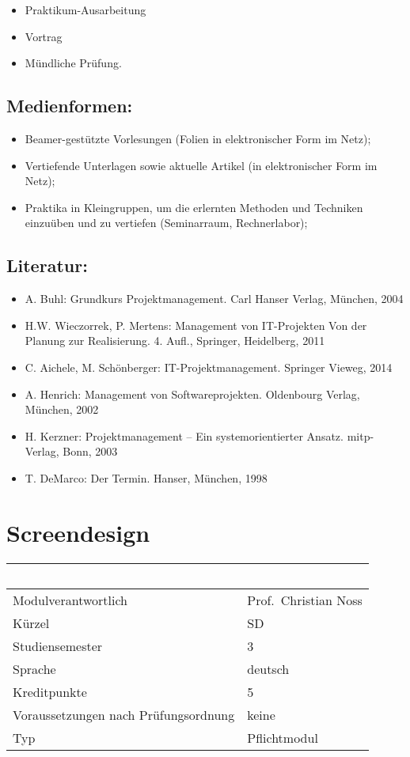 \begin{itemize}
\item
  Praktikum-Ausarbeitung
\item
  Vortrag
\item
  Mündliche Prüfung.
\end{itemize}

\section*{Medienformen:}\label{medienformen-11}

\begin{itemize}
\item
  Beamer-gestützte Vorlesungen (Folien in elektronischer Form im Netz);
\item
  Vertiefende Unterlagen sowie aktuelle Artikel (in elektronischer Form
  im Netz);
\item
  Praktika in Kleingruppen, um die erlernten Methoden und Techniken
  einzuüben und zu vertiefen (Seminarraum, Rechnerlabor);
\end{itemize}

\section*{Literatur:}\label{literatur-16}

\begin{itemize}
\item
  A. Buhl: Grundkurs Projektmanagement. Carl Hanser Verlag, München,
  2004
\item
  H.W. Wieczorrek, P. Mertens: Management von IT-Projekten Von der
  Planung zur Realisierung. 4. Aufl., Springer, Heidelberg, 2011
\item
  C. Aichele, M. Schönberger: IT-Projektmanagement. Springer Vieweg,
  2014
\item
  A. Henrich: Management von Softwareprojekten. Oldenbourg Verlag,
  München, 2002
\item
  H. Kerzner: Projektmanagement -- Ein systemorientierter Ansatz.
  mitp-Verlag, Bonn, 2003
\item
  T. DeMarco: Der Termin. Hanser, München, 1998
\end{itemize}

\chapter{Screendesign}\label{screendesign}

\begin{longtable}[]{@{}ll@{}}
\toprule
~ & ~\tabularnewline
\midrule
\endhead
Modulverantwortlich & Prof.~Christian Noss\tabularnewline
Kürzel & SD\tabularnewline
Studiensemester & 3\tabularnewline
Sprache & deutsch\tabularnewline
Kreditpunkte & 5\tabularnewline
Voraussetzungen nach Prüfungsordnung & keine\tabularnewline
Typ & Pflichtmodul\tabularnewline
\bottomrule
\end{longtable}

